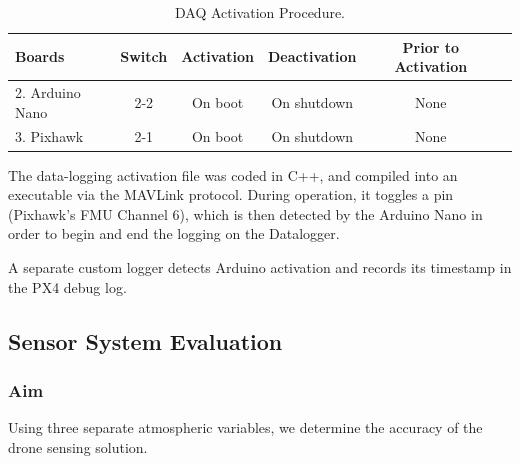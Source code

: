   

\begin{table}[!h]
  \footnotesize%
  \begin{flushleft}
    \begin{tabular}{lccccl}
      \toprule
      Boards                     & Switch  & Activation & Deactivation & Prior to Activation \\
      \midrule
      2. Arduino Nano   & 2-2    &  On boot         & On shutdown    & None  \\
      3. Pixhawk        & 2-1    &  On boot         & On shutdown       & None \\
      \bottomrule
    \end{tabular}
  \end{flushleft}
  \caption{DAQ Activation Procedure.}
  \label{tab:daq_activation}
\end{table}

The data-logging activation file was coded in C++, and compiled into an executable via the MAVLink protocol. During operation, it toggles a pin (Pixhawk's FMU Channel 6), which is then detected by the Arduino Nano in order to begin and end the logging on the Datalogger. 

A separate custom logger detects Arduino activation and records its timestamp in the PX4 debug log.

\pagebreak
\subsection{Sensor System Evaluation}
\subsubsection{Aim}
Using three separate atmospheric variables, we determine the accuracy of the drone sensing solution.

